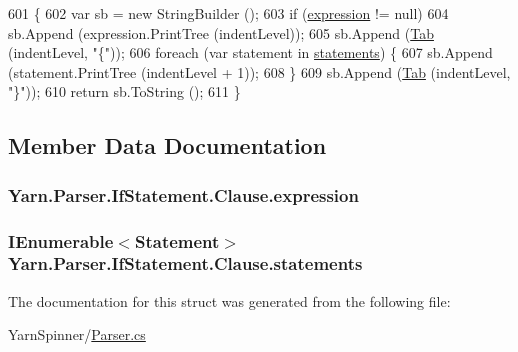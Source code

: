 \begin{DoxyCode}
601                                                            \{
602                     var sb = \textcolor{keyword}{new} StringBuilder ();
603                     \textcolor{keywordflow}{if} (\hyperlink{a00028_a1abd1f7c41f68ccdf64074ea49365be9}{expression} != null)
604                         sb.Append (expression.PrintTree (indentLevel));
605                     sb.Append (\hyperlink{a00121_aa8fa36b46de12a1c561d77b99c4b9ae3}{Tab} (indentLevel, \textcolor{stringliteral}{"\{"}));
606                     \textcolor{keywordflow}{foreach} (var statement \textcolor{keywordflow}{in} \hyperlink{a00028_a6f4765482e98ed042e38a0ede13f171f}{statements}) \{
607                         sb.Append (statement.PrintTree (indentLevel + 1));
608                     \}
609                     sb.Append (\hyperlink{a00121_aa8fa36b46de12a1c561d77b99c4b9ae3}{Tab} (indentLevel, \textcolor{stringliteral}{"\}"}));
610                     \textcolor{keywordflow}{return} sb.ToString ();
611                 \}
\end{DoxyCode}


\subsection{Member Data Documentation}
\hypertarget{a00028_a1abd1f7c41f68ccdf64074ea49365be9}{
\subsubsection[{expression}]{ Yarn.\-Parser.\-If\-Statement.\-Clause.\-expression\hspace{0.3cm}{\ttfamily [package]}}}\label{a00028_a1abd1f7c41f68ccdf64074ea49365be9}
\hypertarget{a00028_a6f4765482e98ed042e38a0ede13f171f}{
\subsubsection[{statements}]{\setlength{\rightskip}{0pt plus 5cm}I\-Enumerable$<${\bf Statement}$>$ Yarn.\-Parser.\-If\-Statement.\-Clause.\-statements\hspace{0.3cm}{\ttfamily [package]}}}\label{a00028_a6f4765482e98ed042e38a0ede13f171f}


The documentation for this struct was generated from the following file\-:\begin{DoxyCompactItemize}
\item 
Yarn\-Spinner/\hyperlink{a00266}{Parser.\-cs}\end{DoxyCompactItemize}

